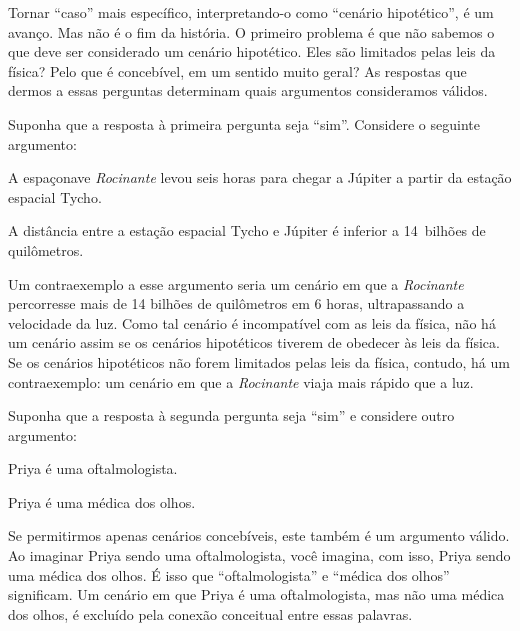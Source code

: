 Tornar \textquotedblleft caso\textquotedblright{} mais específico, interpretando-o como \textquotedblleft cenário hipotético\textquotedblright{}, é um avanço. Mas não é o fim da história. O primeiro problema é que não sabemos o que deve ser considerado um cenário hipotético. Eles são limitados pelas leis da física? Pelo que é concebível, em um sentido muito geral? As respostas que dermos a essas perguntas determinam quais argumentos consideramos válidos.

Suponha que a resposta à primeira pergunta seja \textquotedblleft sim\textquotedblright{}. Considere o seguinte argumento:
	\begin{earg}
		\item[] A espaçonave \textit{Rocinante} levou seis horas para chegar a Júpiter a partir da estação espacial Tycho.
		\item[\texttherefore] A distância entre a estação espacial Tycho e Júpiter é inferior a 14~bilhões de quilômetros.
	\end{earg}
Um contraexemplo a esse argumento seria um cenário em que a \textit{Rocinante} percorresse mais de 14 bilhões de quilômetros em 6 horas, ultrapassando a velocidade da luz. Como tal cenário é incompatível com as leis da física, não há um cenário assim se os cenários hipotéticos tiverem de obedecer às leis da física. Se os cenários hipotéticos não forem limitados pelas leis da física, contudo, há um contraexemplo: um cenário em que a \textit{Rocinante} viaja mais rápido que a luz.

Suponha que a resposta à segunda pergunta seja \textquotedblleft sim\textquotedblright{} e considere outro argumento:
	\begin{earg}
		\item[] Priya é uma oftalmologista.
		\item[\texttherefore] Priya é uma médica dos olhos.
	\end{earg}
Se permitirmos apenas cenários concebíveis, este também é um argumento válido. Ao imaginar Priya sendo uma oftalmologista, você imagina, com isso, Priya sendo uma médica dos olhos. É isso que \textquotedblleft oftalmologista\textquotedblright{} e \textquotedblleft médica dos olhos\textquotedblright{} significam. Um cenário em que Priya é uma oftalmologista, mas não uma médica dos olhos, é excluído pela conexão conceitual entre essas palavras.

